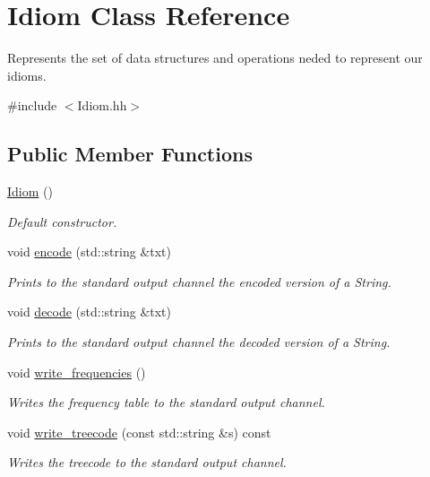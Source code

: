 \hypertarget{classIdiom}{}\section{Idiom Class Reference}
\label{classIdiom}


Represents the set of data structures and operations neded to represent our idioms.  




{\ttfamily \#include $<$Idiom.\+hh$>$}

\subsection*{Public Member Functions}
\begin{DoxyCompactItemize}
\item 
\hyperlink{classIdiom_aa32393a932b72825782d348e6f4ddecb}{Idiom} ()
\begin{DoxyCompactList}\small\item\em Default constructor. \end{DoxyCompactList}\item 
void \hyperlink{classIdiom_a16a0d83ac00a85cfe6e934eb44a5414a}{encode} (std\+::string \&txt)
\begin{DoxyCompactList}\small\item\em Prints to the standard output channel the encoded version of a String. \end{DoxyCompactList}\item 
void \hyperlink{classIdiom_a82b74f6068e36ad658af962dc01572cf}{decode} (std\+::string \&txt)
\begin{DoxyCompactList}\small\item\em Prints to the standard output channel the decoded version of a String. \end{DoxyCompactList}\item 
void \hyperlink{classIdiom_ae596199341218054d763850ff4ecb316}{write\+\_\+frequencies} ()
\begin{DoxyCompactList}\small\item\em Writes the frequency table to the standard output channel. \end{DoxyCompactList}\item 
void \hyperlink{classIdiom_ae860afb3dcb10d69e3d1ac9a5c25508b}{write\+\_\+treecode} (const std\+::string \&s) const
\begin{DoxyCompactList}\small\item\em Writes the treecode to the standard output channel. \end{DoxyCompactList}\item 

\end{DoxyCompactItemize}
